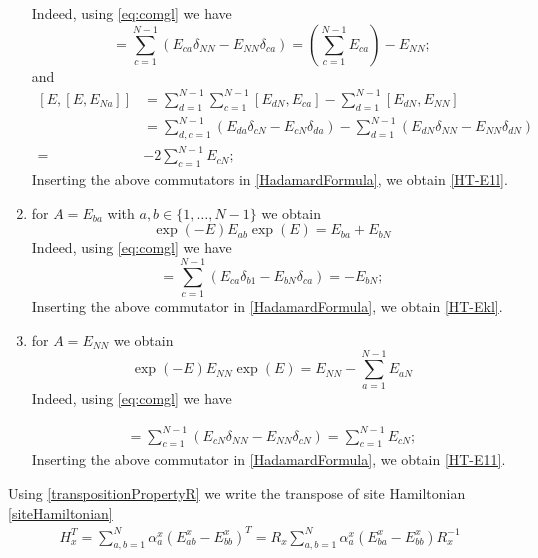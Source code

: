 \documentclass[10pt]{article}
\numberwithin{equation}{section}
\numberwithin{equation}{subsection}
\begin{document}
\begin{enumerate}
    Indeed, using \eqref{eq:comgl} we have 
    \begin{equation}
[E,E_{Na}]=\sum_{c=1}^{N-1}\left(E_{ca}\delta_{NN}-E_{NN}\delta_{ca}\right)= (\sum_{c=1}^{N-1}E_{ca} ) -E_{NN};
\end{equation}
and 
\begin{equation}
\begin{split}
\left[E,[E,E_{Na}]\right]&=\sum_{d=1}^{N-1}\sum_{c=1}^{N-1}\left[E_{dN},E_{ca}\right]-\sum_{d=1}^{N-1}\left[E_{dN},E_{NN}\right]
\\&=
\sum_{d,c=1}^{N-1}\left(E_{da}\delta_{cN}-E_{cN}\delta_{da}\right)-\sum_{d=1}^{N-1}\left(E_{dN}\delta_{NN}-E_{NN}\delta_{dN}\right)
\\=&
-2\sum_{c=1}^{N-1}E_{cN};
\end{split}
\end{equation}
Inserting the above commutators in \eqref{HadamardFormula}, we obtain \eqref{HT-E1l}.
\item for $A=E_{ba}$ with $a,b \in \{1,\ldots,N-1\}$ we obtain 
\begin{equation}\label{HT-Ekl}
    \exp{(-E)}E_{a b}\exp{(E)}=E_{ba}+E_{bN}
\end{equation}
   Indeed, using \eqref{eq:comgl} we have 
\begin{equation}
[E,E_{ba}]=\sum_{c=1}^{N-1}\left(E_{ca}\delta_{b1}-E_{bN}\delta_{c a}\right)=-E_{bN};
\end{equation}
Inserting the above commutator in \eqref{HadamardFormula}, we obtain \eqref{HT-Ekl}.
\item for $A=E_{NN}$ we obtain 
\begin{equation}\label{HT-E11}
    \exp{(-E)}E_{NN}\exp{(E)}=E_{NN}-\sum_{a=1}^{N-1}E_{aN}
\end{equation}
  Indeed, using \eqref{eq:comgl} we have 

\begin{align*}
[E,E_{NN}]=\sum_{c=1}^{N-1}\left(E_{cN}\delta_{NN}-E_{NN}\delta_{cN}\right)=\sum_{c=1}^{N-1}E_{cN};
\end{align*}
  Inserting the above commutator in \eqref{HadamardFormula}, we obtain \eqref{HT-E11}.
\end{enumerate}
Using \eqref{transpositionPropertyR} we write the transpose of site Hamiltonian \eqref{siteHamiltonian} 
\begin{equation}
    \begin{split}
H_{x}^{T}=\sum_{a,b=1}^{N}\alpha_{a}^{x}\left(E_{ab}^{x}-E_{bb}^{x}\right)^{T}=R_{x}\sum_{a,b=1}^{N}\alpha_{a}^{x}\left(E_{b a}^{x}-E_{bb}^{x}\right)R_{x}^{-1}
    \end{split}
\end{equation}
\end{document}
